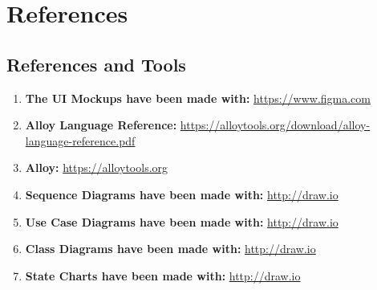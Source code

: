 \documentclass{article}
\begin{document}
\section{References}
\subsection{References and Tools}
\begin{enumerate}
    \item \textbf{The UI Mockups have been made with:} \url{https://www.figma.com}
    \item \textbf{Alloy Language Reference:} \url{https://alloytools.org/download/alloy-language-reference.pdf}
    \item \textbf{Alloy:} \url{https://alloytools.org}
    \item \textbf{Sequence Diagrams have been made with:} \url{http://draw.io}
    \item \textbf{Use Case Diagrams have been made with:} \url{http://draw.io}
    \item \textbf{Class Diagrams have been made with:} \url{http://draw.io}
    \item \textbf{State Charts have been made with:} \url{http://draw.io}
\end{enumerate}

\maketitle
\end{document}
